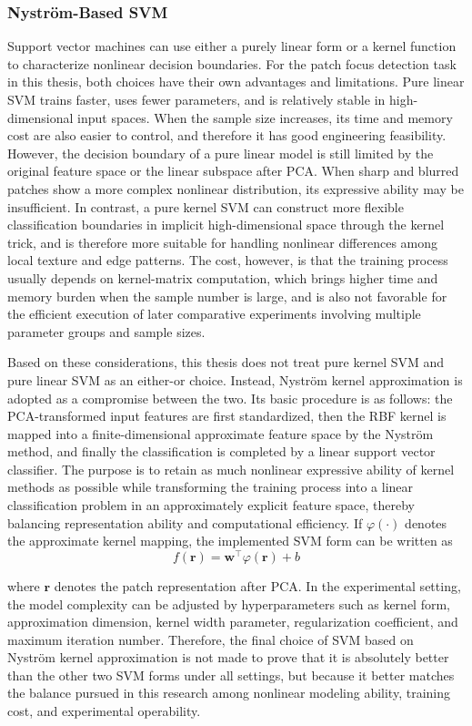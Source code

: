 \subsubsection{Nystr\"{o}m-Based SVM}
\par Support vector machines can use either a purely linear form or a kernel
function to characterize nonlinear decision boundaries. For the patch focus
detection task in this thesis, both choices have their own advantages and
limitations. Pure linear SVM trains faster, uses fewer parameters, and is
relatively stable in high-dimensional input spaces. When the sample size
increases, its time and memory cost are also easier to control, and therefore
it has good engineering feasibility. However, the decision boundary of a pure
linear model is still limited by the original feature space or the linear
subspace after PCA. When sharp and blurred patches show a more complex
nonlinear distribution, its expressive ability may be insufficient. In
contrast, a pure kernel SVM can construct more flexible classification
boundaries in implicit high-dimensional space through the kernel trick, and is
therefore more suitable for handling nonlinear differences among local texture
and edge patterns. The cost, however, is that the training process usually
depends on kernel-matrix computation, which brings higher time and memory
burden when the sample number is large, and is also not favorable for the
efficient execution of later comparative experiments involving multiple
parameter groups and sample sizes.

\par Based on these considerations, this thesis does not treat pure kernel SVM
and pure linear SVM as an either-or choice. Instead, Nystr\"{o}m kernel
approximation is adopted as a compromise between the two. Its basic procedure
is as follows: the PCA-transformed input features are first standardized, then
the RBF kernel is mapped into a finite-dimensional approximate feature space by
the Nystr\"{o}m method, and finally the classification is completed by a linear
support vector classifier. The purpose is to retain as much nonlinear
expressive ability of kernel methods as possible while transforming the
training process into a linear classification problem in an approximately
explicit feature space, thereby balancing representation ability and
computational efficiency. If $\varphi(\cdot)$ denotes the approximate kernel
mapping, the implemented SVM form can be written as
\begin{equation}
    f(\mathbf{r})=\mathbf{w}^\top \varphi(\mathbf{r})+b
    \label{eq:svm-nystroem}
\end{equation}
\par where $\mathbf{r}$ denotes the patch representation after PCA. In the
experimental setting, the model complexity can be adjusted by hyperparameters
such as kernel form, approximation dimension, kernel width parameter,
regularization coefficient, and maximum iteration number. Therefore, the final
choice of SVM based on Nystr\"{o}m kernel approximation is not made to prove
that it is absolutely better than the other two SVM forms under all settings,
but because it better matches the balance pursued in this research among
nonlinear modeling ability, training cost, and experimental operability.

